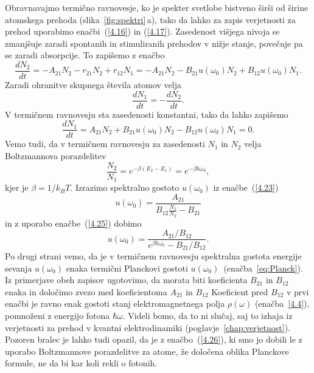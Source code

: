 Obravnavajmo termično ravnovesje, ko je spekter svetlobe bistveno širši
od širine atomskega prehoda (slika~\ref{fig:spektri}\,a), tako da lahko za zapis
verjetnosti za prehod uporabimo enačbi~(\ref{4.16}) in (\ref{4.17}). Zasedenost višjega nivoja
se zmanjšuje zaradi spontanih in stimuliranih prehodov v nižje
stanje, povečuje pa se zaradi absorpcije. To zapišemo z enačbo
\begin{equation}
\frac{dN_{2}}{dt}=-A_{21}N_2 - r_{21}N_2 + r_{12}N_1 = 
-A_{21}N_{2}-B_{21}u(\omega_{0})N_{2}+B_{12}u(\omega_{0})N_{1}.
\label{4.22}
\end{equation}
Zaradi ohranitve skupnega števila atomov velja 
\begin{equation}
\frac{dN_{1}}{dt}=-\frac{dN_{2}}{dt}.
\end{equation}
V termičnem ravnovesju sta zasedenosti konstantni, tako da lahko zapišemo 
\begin{equation}
\frac{dN_{1}}{dt}=A_{21}N_{2}+B_{21}u(\omega_{0})N_{2}-B_{12}u(\omega_{0})N_{1}=0.
\label{4.23}
\end{equation}
Vemo tudi, da v termičnem ravnovesju za zasedenosti $N_{1}$ in $N_{2}$ velja
Boltzmannova porazdelitev
\begin{equation}
\frac{N_{2}}{N_{1}}=e^{-\beta(E_{2}-E_{1})} = e^{-\beta \hbar \omega_0},
\label{4.25}
\end{equation}
kjer je $\beta=1/k_BT$. Izrazimo spektralno gostoto $u(\omega_0)$ 
iz enačbe~(\ref{4.23})
\begin{equation}
u(\omega_{0})=\frac{A_{21}}{B_{12}\frac{N_{1}}{N_{2}}-B_{21}}
\label{4.24}
\end{equation}
in z uporabo enačbe~(\ref{4.25}) dobimo
\begin{equation}
u(\omega_{0})=\frac{A_{21}/B_{12}}{e^{\beta\hbar\omega_{0}}-B_{21}/B_{12}}.
\label{4.26}
\end{equation}
Po drugi strani vemo, da je v termičnem ravnovesju spektralna gostota energije sevanja
$u(\omega_0)$ enaka termični Planckovi gostoti $u(\omega_{0})$~(enačba~\ref{eq:Planck}).
Iz primerjave obeh zapisov ugotovimo, da morata biti koeficienta $B_{21}$ in $B_{12}$ enaka in
določimo zvezo med koeficientoma $A_{21}$ in $B_{12}$  
Koeficient pred $B_{12}$ v prvi enačbi je ravno enak gostoti stanj elektromagnetnega polja 
$\rho(\omega)$ (enačba~\ref{4.4}), pomnoženi z energijo fotona $\hbar\omega$. 
Videli bomo, da to ni slučaj, saj to izhaja iz verjetnosti za prehod v kvantni 
elektrodinamiki (poglavje~\ref{chap:verjetnost}).
Pozoren bralec je lahko tudi opazil, da je z enačbo~(\ref{4.26}),
ki smo jo dobili le z uporabo Boltzmannove porazdelitve za atome, že
določena oblika Planckove formule, ne da bi kar koli rekli o fotonih.

